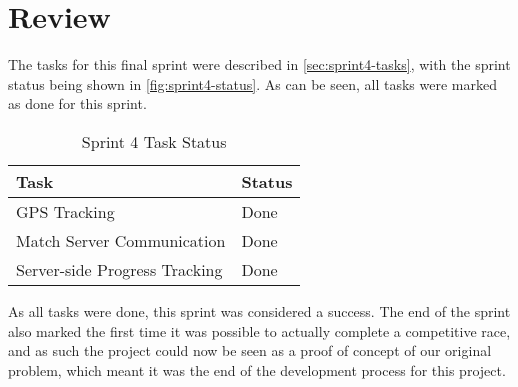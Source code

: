 \section{Review}
\label{sec:sprint4-review}

The tasks for this final sprint were described in \autoref{sec:sprint4-tasks}, with the sprint status being shown in \autoref{fig:sprint4-status}. As can be seen, all tasks were marked as done for this sprint.

\begin{table}[!ht]
	\centering
	\begin{tabular}{|l|l|}
		\hline
		\textbf{Task} & \textbf{Status} \\
		\hline
		\ac{GPS} Tracking & Done \\
		\hline
		Match Server Communication & Done \\
		\hline
		Server-side Progress Tracking & Done \\
		\hline
	\end{tabular}
	\caption{Sprint 4 Task Status}
	\label{fig:sprint4-status}
\end{table}

As all tasks were done, this sprint was considered a success. The end of the sprint also marked the first time it was possible to actually complete a competitive race, and as such the project could now be seen as a proof of concept of our original problem, which meant it was the end of the development process for this project.

